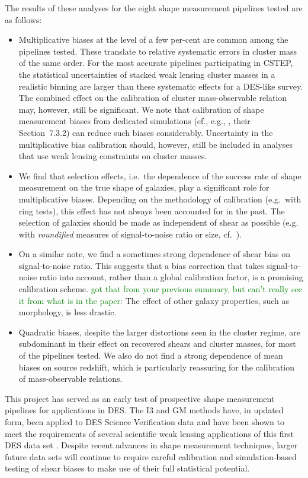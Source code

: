 \documentclass[useAMS,usenatbib]{mn2e}
\newcommand{\green}[1]{\textcolor{green}{#1}}
\begin{document}
The results of these analyses for the eight shape measurement pipelines tested are as follows:
\begin{itemize}
\item Multiplicative biases at the level of a few per-cent are common among the pipelines tested. These translate to relative systematic errors in cluster mass of the same order. For the most accurate pipelines participating in CSTEP, the statistical uncertainties of stacked weak lensing cluster masses in a realistic binning are larger than these systematic effects for a DES-like survey. The combined effect on the calibration of cluster mass-observable relation may, however, still be significant. We note that calibration of shape measurement biases from dedicated simulations (cf., e.g., \citealt{jarvis}, their Section~7.3.2) can reduce such biases considerably. Uncertainty in the multiplicative bias calibration should, however, still be included in analyses that use weak lensing constraints on cluster masses. 
\item We find that selection effects, i.e.~the dependence of the success rate of shape measurement on the true shape of galaxies, play a significant role for multiplicative biases. Depending on the methodology of calibration (e.g.~with ring tests), this effect has not always been accounted for in the past. The selection of galaxies should be made as independent of shear as possible (e.g. with \emph{roundified} measures of signal-to-noise ratio or size, cf.~\citealt{jarvis}).
\item On a similar note, we find a sometimes strong dependence of shear bias on signal-to-noise ratio. This suggests that a bias correction that takes signal-to-noise ratio into account, rather than a global calibration factor, is a promising calibration scheme. \green{got that from your previous summary, but can't really see it from what is in the paper:} The effect of other galaxy properties, such as morphology, is less drastic.
\item Quadratic biases, despite the larger distortions seen in the cluster regime, are subdominant in their effect on recovered shears and cluster masses, for most of the pipelines tested. We also do not find a strong dependence of mean biases on source redshift, which is particularly reassuring for the calibration of mass-observable relations.
\end{itemize}

This project has served as an early test of prospective shape measurement pipelines for applications in DES. The I3 and GM methods have, in updated form, been applied to DES Science Verification data \citep{jarvis} and have been shown to meet the requirements of several scientific weak lensing applications of this first DES data set \citep[cf.][]{vikram,chang,becker,troughs}. Despite recent advances in shape measurement techniques, larger future data sets will continue to require careful calibration and simulation-based testing of shear biases to make use of their full statistical potential.
\end{document}
